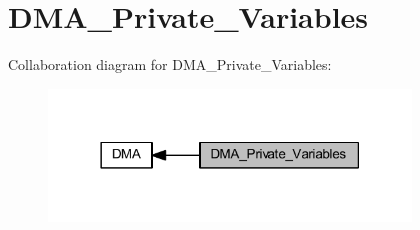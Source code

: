 \hypertarget{group___d_m_a___private___variables}{}\section{D\+M\+A\+\_\+\+Private\+\_\+\+Variables}
\label{group___d_m_a___private___variables}
Collaboration diagram for D\+M\+A\+\_\+\+Private\+\_\+\+Variables\+:
\nopagebreak
\begin{figure}[H]
\begin{center}
\leavevmode
\includegraphics[width=273pt]{group___d_m_a___private___variables}
\end{center}
\end{figure}
